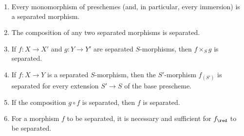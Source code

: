 \begin{proposition}[5.5.1]
\label{I.5.5.1}
\medskip\noindent
\begin{enumerate}
  \item[{\rm(i)}] Every monomorphism of preschemes (and, in particular, every immersion) is a separated morphism.
  \item[{\rm(ii)}] The composition of any two separated morphisms is separated.
  \item[{\rm(iii)}] If $f:X\to X'$ and $g:Y\to Y'$ are separated $S$-morphisms, then $f\times_S g$ is separated.
  \item[{\rm(iv)}] If $f:X\to Y$ is a separated $S$-morphism, then the $S'$-morphism $f_{(S')}$ is separated for every extension $S'\to S$ of the base prescheme.
  \item[{\rm(v)}] If the composition $g\circ f$ is separated, then $f$ is separated.
  \item[{\rm(vi)}] For a morphism $f$ to be separated, it is necessary and sufficient for $f_\red$  to be separated.
\end{enumerate}
\end{proposition}


